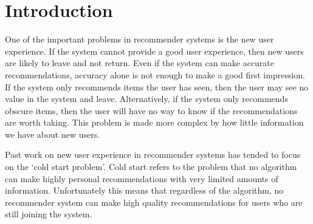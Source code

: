 \documentclass[letterpaper]{sig-alternate}
\begin{document}



\section{Introduction}

  One of the important problems in recommender systems is the new user experience.
  If the system cannot provide a good user experience, then new users are likely to leave and not return.
  Even if the system can make accurate recommendations, accuracy alone is not enough to make a good first impression.
  If the system only recommends items the user has seen, then the user may see no value in the system and leave.
  Alternatively, if the system only recommends obscure items, then the user will have no way to know if the recommendations are worth taking.
  This problem is made more complex by how little information we have about new users.
  

  Past work on new user experience in recommender systems has tended to focus on the `cold start problem'.
  Cold start refers to the problem that no algorithm can make highly personal recommendations with very limited amounts of information.
  Unfortunately this means that regardless of the algorithm, no recommender system can make high quality recommendations for users who are still joining the system.
  
\end{document}
